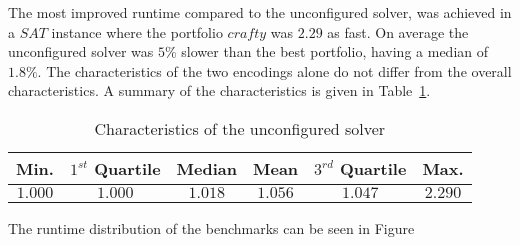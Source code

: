 The most improved runtime compared to the unconfigured solver, was achieved in a $SAT$ instance where the portfolio $crafty$ was $2.29$ as fast. On average the unconfigured solver was $5\%$ slower than the best portfolio, having a median of $1.8\%$. The characteristics of the two encodings alone do not differ from the overall characteristics. A summary of the characteristics is given in Table~\ref{tbl:charcmp}.

\begin{table}[h]
	\center
	\begin{tabular}{c|c|c|c|c|c}
		Min. & $1^{st}$ Quartile & Median & Mean & $3^{rd}$ Quartile & Max. \\
		\hline
		$1.000$&$1.000$&$1.018$&$1.056$&$1.047$ &$2.290$
	\end{tabular}
	\caption{Characteristics of the unconfigured solver\label{tbl:charcmp}}
\end{table}

The runtime distribution of the benchmarks can be seen in Figure%
